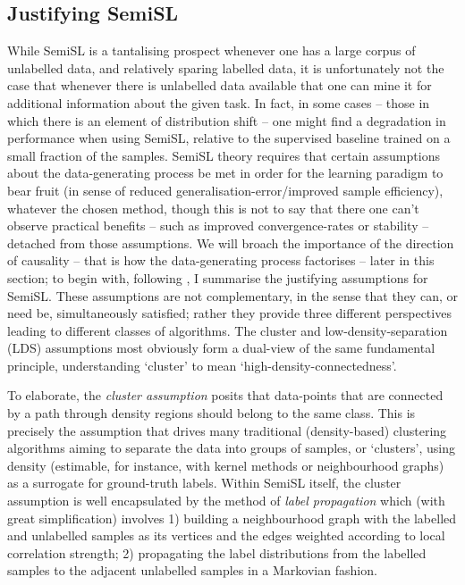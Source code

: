 \subsection{Justifying \acs{SemiSL}}\label{ssec:assumptions}
While \ac{SemiSL} is a tantalising prospect whenever one has a large corpus of unlabelled data, and
relatively sparing labelled data, it is unfortunately not the case that whenever there is
unlabelled data available that one can mine it for additional information about the given task. 
%
In fact, in some cases -- those in which there is an element of distribution shift -- one might
find a degradation in performance when using \ac{SemiSL}, relative to the supervised baseline trained on
a small fraction of the samples.
%
\ac{SemiSL} theory requires that certain assumptions about the data-generating process be met in order
for the learning paradigm to bear fruit (in sense of reduced generalisation-error/improved sample
efficiency), whatever the chosen method, though this is not to say that there one can't observe
practical benefits -- such as improved convergence-rates or stability -- detached from those
assumptions.
%
We will broach the importance of the direction of causality -- that is how the data-generating
process factorises -- later in this section; to begin with, following \citep{chapelle2009semi}, I
summarise the justifying assumptions for \ac{SemiSL}.
%
These assumptions are not complementary, in the sense that they can, or need be, simultaneously
satisfied; rather they provide three different perspectives leading to different classes of
algorithms. 
%
The cluster and low-density-separation (LDS) assumptions most obviously form a dual-view of the same
fundamental principle, understanding `cluster' to mean `high-density-connectedness'.
%


%
To elaborate, the \emph{cluster assumption} posits that data-points that are connected by a path
through density regions should belong to the same class.
%
This is precisely the assumption that drives many traditional (density-based) clustering algorithms
aiming to separate the data into groups of samples, or `clusters', using density (estimable, for
instance, with kernel methods or neighbourhood graphs) as a surrogate for ground-truth labels.
%
Within \ac{SemiSL} itself, the cluster assumption is well encapsulated by the method of \emph{label
propagation} \citep{szummer2001partially} which (with great simplification) involves 1) building a
neighbourhood graph with the labelled and unlabelled samples as its vertices and the edges weighted
according to local correlation strength; 2) propagating the label distributions from the labelled
samples to the adjacent unlabelled samples in a Markovian fashion.
%

